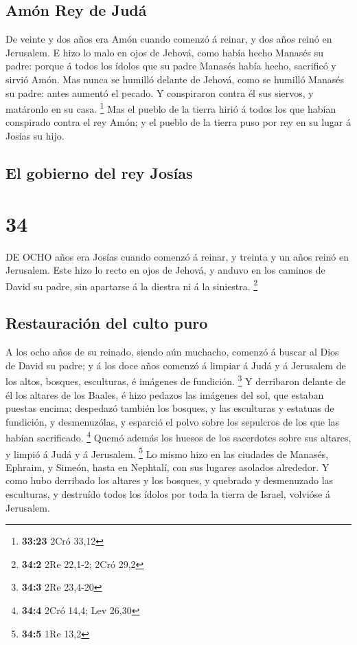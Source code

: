 \hypertarget{amuxf3n-rey-de-juduxe1}{%
\subsection{Amón Rey de Judá}\label{amuxf3n-rey-de-juduxe1}}

 De veinte y dos años era Amón cuando comenzó á reinar, y
dos años reinó en Jerusalem.  E hizo lo malo en ojos de
Jehová, como había hecho Manasés su padre: porque á todos los ídolos que
su padre Manasés había hecho, sacrificó y sirvió Amón.  Mas
nunca se humilló delante de Jehová, como se humilló Manasés su padre:
antes aumentó el pecado.  Y conspiraron contra él sus
siervos, y matáronlo en su casa. \footnote{\textbf{33:23} 2Cró 33,12}
 Mas el pueblo de la tierra hirió á todos los que habían
conspirado contra el rey Amón; y el pueblo de la tierra puso por rey en
su lugar á Josías su hijo. 

\hypertarget{el-gobierno-del-rey-josuxedas}{%
\subsection{El gobierno del rey
Josías}\label{el-gobierno-del-rey-josuxedas}}

\hypertarget{section-33}{%
\section{34}\label{section-33}}

 DE OCHO años era Josías cuando comenzó á reinar, y treinta
y un años reinó en Jerusalem.  Este hizo lo recto en ojos de
Jehová, y anduvo en los caminos de David su padre, sin apartarse á la
diestra ni á la siniestra. \footnote{\textbf{34:2} 2Re 22,1-2; 2Cró 29,2}

\hypertarget{restauraciuxf3n-del-culto-puro}{%
\subsection{Restauración del culto
puro}\label{restauraciuxf3n-del-culto-puro}}

 A los ocho años de su reinado, siendo aún muchacho, comenzó
á buscar al Dios de David su padre; y á los doce años comenzó á limpiar
á Judá y á Jerusalem de los altos, bosques, esculturas, é imágenes de
fundición. \footnote{\textbf{34:3} 2Re 23,4-20}  Y
derribaron delante de él los altares de los Baales, é hizo pedazos las
imágenes del sol, que estaban puestas encima; despedazó también los
bosques, y las esculturas y estatuas de fundición, y desmenuzólas, y
esparció el polvo sobre los sepulcros de los que las habían sacrificado.
\footnote{\textbf{34:4} 2Cró 14,4; Lev 26,30}  Quemó además
los huesos de los sacerdotes sobre sus altares, y limpió á Judá y á
Jerusalem. \footnote{\textbf{34:5} 1Re 13,2}  Lo mismo hizo
en las ciudades de Manasés, Ephraim, y Simeón, hasta en Nephtalí, con
sus lugares asolados alrededor.  Y como hubo derribado los
altares y los bosques, y quebrado y desmenuzado las esculturas, y
destruído todos los ídolos por toda la tierra de Israel, volvióse á
Jerusalem.

